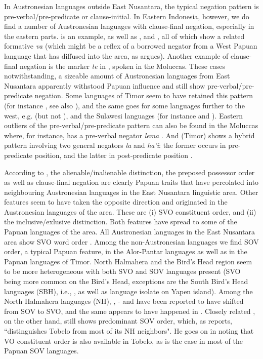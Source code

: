 In Austronesian languages outside East Nusantara, the typical negation pattern is pre-verbal/pre-predicate or clause-initial. In Eastern Indonesia, however, we do find a number of Austronesian languages with clause-final negation, especially in the eastern parts.  is an example, as well as ,  and  \citep{gasser2014windesi}, all of which show a related formative \textit{va} (which might be a reflex of a borrowed negator from a West Papuan language that has diffused into the area, as \citet{reesink2002eastern} argues). Another example of clause-final negation is the marker \textit{te} in , spoken in the Moluccas. These cases notwithstanding, a sizeable amount of Austronesian languages from East Nusantara apparently withstood Papuan influence and still show pre-verbal/pre-predicate negation. Some languages of Timor seem to have retained this pattern (for instance , see also \citealt[132]{klamer2008east}), and the same goes for some languages further to the west, e.g.  (but not ), and the Sulawesi languages (for instance  and ). Eastern outliers of the pre-verbal/pre-predicate pattern can also be found in the Moluccas where, for instance,  has a pre-verbal negator \textit{lema} \citep[140]{coward2005}. And  (Timor) shows a hybrid pattern involving two general negators \textit{la} and \textit{ha'i}: the former occurs in pre-predicate position, and the latter in post-predicate position \citep[228]{vanklinken1999grammar}.

According to \citet{klamer2008east}, the alienable/inalienable distinction, the preposed possessor order as well as clause-final negation are clearly Papuan traits that have percolated into neighbouring Austronesian languages in the East Nusantara linguistic area. Other features seem to have taken the opposite direction and originated in the Austronesian languages of the area. These are (i) SVO constituent order, and (ii) the inclusive/exlusive distinction. Both features have spread to some of the Papuan languages of the area. All Austronesian languages in the East Nusantara area show SVO word order \citep[113]{klamer2008east}. Among the non-Austronesian languages we find SOV order, a typical Papuan feature, in the Alor-Pantar languages as well as in the Papuan languages of Timor. North Halmahera and the Bird's Head region seem to be more heterogeneous with both SVO and SOV languages present (SVO being more common on the Bird's Head, exceptions are the South Bird's Head languages (SBH), i.e., , as well as language isolate  on Yapen island). Among the North Halmahera languages (NH), , - and  have been reported to have shifted from SOV to SVO, and the same appears to have happened in  \citep[114]{klamer2008east}. Closely related , on the other hand, still shows predominant SOV order, which, as \citet[55]{holton2003tobelo} reports, ``distinguishes Tobelo from most of its NH neighbors". He goes on in noting that VO constituent order is also available in Tobelo, as is the case in most of the Papuan SOV languages.

